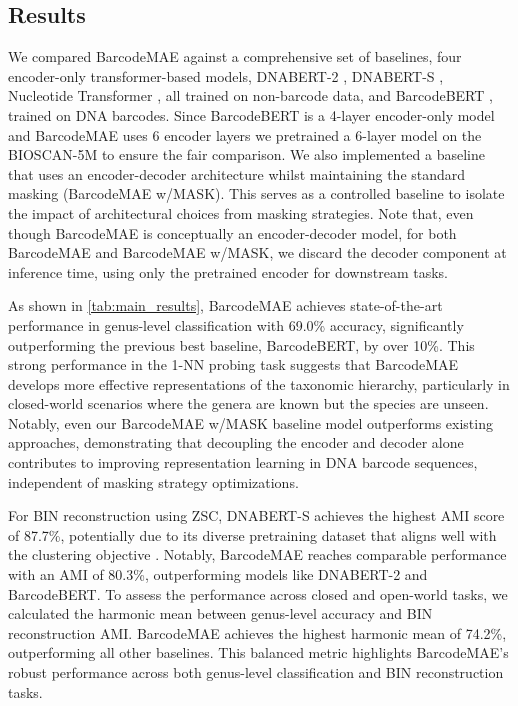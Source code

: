 
\subsection{Results}
\label{s:results}

We compared BarcodeMAE against a comprehensive set of baselines, four encoder-only transformer-based models, DNABERT-2 \citep{zhou2023dnabert2}, DNABERT-S \citep{zhou2024dnaberts}, Nucleotide Transformer \citep{NucleotideTransformerDalla-Torre2023}, all trained on non-barcode data, and BarcodeBERT \citep{arias2023barcodebert}, trained on DNA barcodes. Since BarcodeBERT is a 4-layer encoder-only model and BarcodeMAE uses 6 encoder layers we pretrained a 6-layer model on the BIOSCAN-5M to ensure the fair comparison. We also implemented a baseline that uses an encoder-decoder architecture whilst maintaining the standard masking (BarcodeMAE w/MASK). This serves as a controlled baseline to isolate the impact of architectural choices from masking strategies. Note that, even though BarcodeMAE is conceptually an encoder-decoder model, for both BarcodeMAE and BarcodeMAE w/MASK, we discard the decoder component at inference time, using only the pretrained encoder for downstream tasks. 


As shown in \autoref{tab:main_results}, BarcodeMAE achieves state-of-the-art performance in genus-level classification with 69.0\% accuracy, significantly outperforming the previous best baseline, BarcodeBERT, by over 10\%. This strong performance in the 1-NN probing task suggests that BarcodeMAE develops more effective representations of the taxonomic hierarchy, particularly in closed-world scenarios where the genera are known but the species are unseen. Notably, even our BarcodeMAE w/MASK baseline model outperforms existing approaches, demonstrating that decoupling the encoder and decoder alone contributes to improving representation learning in DNA barcode sequences, independent of masking strategy optimizations.


For BIN reconstruction using ZSC, DNABERT-S achieves the highest AMI score of 87.7\%, potentially due to its diverse pretraining dataset that aligns well with the clustering objective \citep{zhou2024dnaberts}. Notably, BarcodeMAE reaches comparable performance with an AMI of 80.3\%, outperforming models like DNABERT-2 and BarcodeBERT. To assess the performance across closed and open-world tasks, we calculated the harmonic mean between genus-level accuracy and BIN reconstruction AMI. BarcodeMAE achieves the highest harmonic mean of 74.2\%, outperforming all other baselines. This balanced metric highlights BarcodeMAE's robust performance across both genus-level classification and BIN reconstruction tasks.

